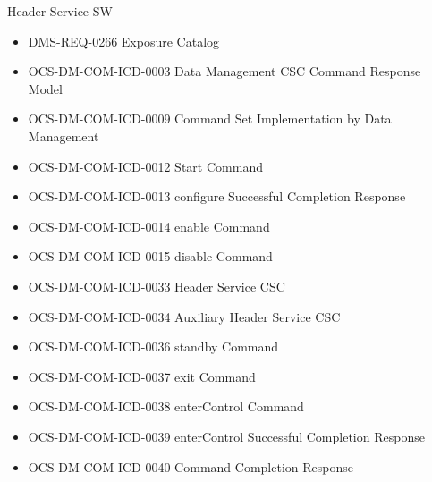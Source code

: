 Header Service SW \begin{itemize}
\item DMS-REQ-0266 Exposure Catalog
\item OCS-DM-COM-ICD-0003 Data Management CSC Command Response Model
\item OCS-DM-COM-ICD-0009 Command Set Implementation by Data Management
\item OCS-DM-COM-ICD-0012 Start Command
\item OCS-DM-COM-ICD-0013 configure Successful Completion Response
\item OCS-DM-COM-ICD-0014 enable Command
\item OCS-DM-COM-ICD-0015 disable Command
\item OCS-DM-COM-ICD-0033 Header Service CSC
\item OCS-DM-COM-ICD-0034 Auxiliary Header Service CSC
\item OCS-DM-COM-ICD-0036 standby Command
\item OCS-DM-COM-ICD-0037 exit Command
\item OCS-DM-COM-ICD-0038 enterControl Command
\item OCS-DM-COM-ICD-0039 enterControl Successful Completion Response
\item OCS-DM-COM-ICD-0040 Command Completion Response
\end{itemize}

